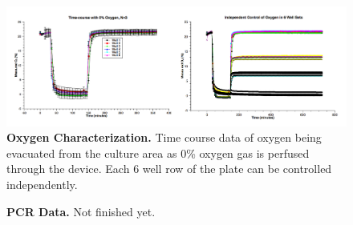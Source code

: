 \documentclass[]{article}
\begin{document}
\begin{figure}[H]
\includegraphics[scale=0.25]{fig2.png}
\caption{
{\bf Oxygen Characterization.}  Time course data of oxygen being evacuated from the culture area as 0\% oxygen gas is perfused through the device. Each 6 well row of the plate can be controlled independently.  
}
\label{figure2}
\end{figure}

\begin{figure}[H]
\caption{
{\bf PCR Data.}  Not finished yet.  
}
\label{pcr-data}
\end{figure}



\end{document}
